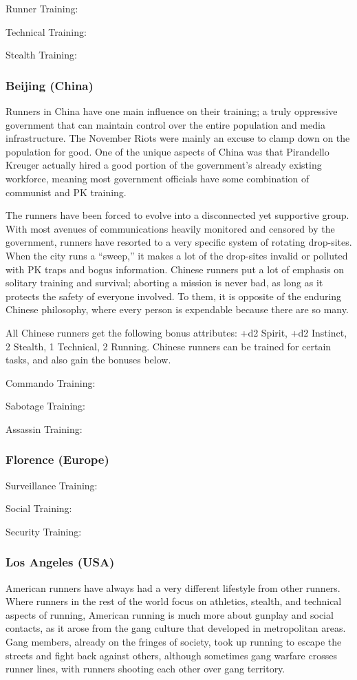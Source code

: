 \documentclass{article}
\begin{document}
\begin{multicols}{2}
Runner Training:

Technical Training:

Stealth Training:
\subsubsection{Beijing (China)}
Runners in China have one main influence on their training; a truly oppressive government that can maintain control over the entire population and media infrastructure. The November Riots were mainly an excuse to clamp down on the population for good. One of the unique aspects of China was that Pirandello Kreuger actually hired a good portion of the government’s already existing workforce, meaning most government officials have some combination of communist and PK training.

The runners have been forced to evolve into a disconnected yet supportive group. With most avenues of communications heavily monitored and censored by the government, runners have resorted to a very specific system of rotating drop-sites. When the city runs a “sweep,” it makes a lot of the drop-sites invalid or polluted with PK traps and bogus information. Chinese runners put a lot of emphasis on solitary training and survival; aborting a mission is never bad, as long as it protects the safety of everyone involved. To them, it is opposite of the enduring Chinese philosophy, where every person is expendable because there are so many.

All Chinese runners get the following bonus attributes: +d2 Spirit, +d2 Instinct, 2 Stealth, 1 Technical, 2 Running. Chinese runners can be trained for certain tasks, and also gain the bonuses below.

Commando Training:

Sabotage Training:

Assassin Training:
\subsubsection{Florence (Europe)}
Surveillance Training:

Social Training:

Security Training:
\subsubsection{Los Angeles (USA)}
American runners have always had a very different lifestyle from other runners. Where runners in the rest of the world focus on athletics, stealth, and technical aspects of running, American running is much more about gunplay and social contacts, as it arose from the gang culture that developed in metropolitan areas. Gang members, already on the fringes of society, took up running to escape the streets and fight back against others, although sometimes gang warfare crosses runner lines, with runners shooting each other over gang territory.


\end{multicols}
\end{document}
